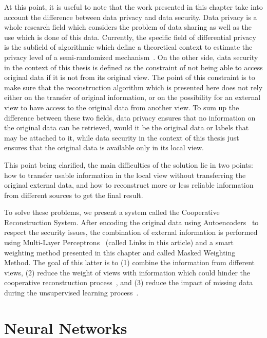 At this point, it is useful to note that the work presented in this chapter take into account the difference between data privacy and data security. Data privacy is a whole research field which considers the problem of data sharing as well as the use which is done of this data. Currently, the specific field of differential privacy is the subfield of algorithmic which define a theoretical context to estimate the privacy level of a semi-randomized mechanism~\cite{dwork2010differential}. On the other side, data security in the context of this thesis is defined as the constraint of not being able to access original data if it is not from its original view. The point of this constraint is to make sure that the reconstruction algorithm which is presented here does not rely either on the transfer of original information, or on the possibility for an external view to have access to the original data from another view. To sum up the difference between these two fields, data privacy ensures that no information on the original data can be retrieved, would it be the original data or labels that may be attached to it, while data security in the context of this thesis just ensures that the original data is available only in its local view.

This point being clarified, the main difficulties of the solution lie in two points: how to transfer usable information in the local view without transferring the original external data, and how to reconstruct more or less reliable information from different sources to get the final result.

To solve these problems, we present a system called the Cooperative Reconstruction System. After encoding the original data using Autoencoders~\cite{hinton2006reducing} to respect the security issues, the combination of external information is performed using Multi-Layer Perceptrons~\cite{rumelhart1985learning} (called Links in this article) and a smart weighting method presented in this chapter and called Masked Weighting Method. The goal of this latter is to (1) combine the information from different views, (2) reduce the weight of views with information which could hinder the cooperative reconstruction process~\cite{sublime2018youpi}, and (3) reduce the impact of missing data during the unsupervised learning process~\cite{DBLP:journals/bmcbi/SoutoJC15}.


\section{Neural Networks}
\label{sec:nn}

